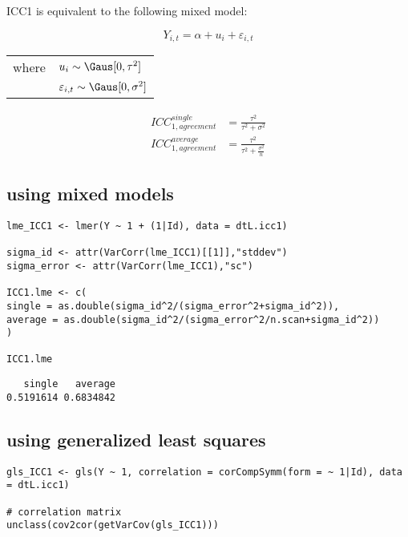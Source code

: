 \documentclass{article}
\begin{document}
\bigskip

ICC1 is equivalent to the following mixed model:

\begin{equation}
 Y_{i,t} = \alpha + u_{i} + \varepsilon_{i,t} 
\end{equation}

\begin{tabular}{ll}
where & \(u_{i} \sim \Gaus[0,\tau^2] \)  \\
& \(\varepsilon_{i,t} \sim \Gaus[0,\sigma^2] \) \\
\end{tabular}

\begin{align}
 ICC^{single}_{1,agreement} &= \frac{\tau^2}{\tau^2 + \sigma^2} \\
 ICC^{average}_{1,agreement} &= \frac{\tau^2}{\tau^2 + \frac{\sigma^2}{n}}
\end{align}

\bigskip

\subsection{using mixed models}
\label{sec:orgc8b4baa}
\lstset{language=r,label= ,caption= ,captionpos=b,numbers=none}
\begin{lstlisting}
lme_ICC1 <- lmer(Y ~ 1 + (1|Id), data = dtL.icc1)

sigma_id <- attr(VarCorr(lme_ICC1)[[1]],"stddev")
sigma_error <- attr(VarCorr(lme_ICC1),"sc")

ICC1.lme <- c(
single = as.double(sigma_id^2/(sigma_error^2+sigma_id^2)),
average = as.double(sigma_id^2/(sigma_error^2/n.scan+sigma_id^2))
)

ICC1.lme
\end{lstlisting}

\begin{verbatim}
   single   average 
0.5191614 0.6834842
\end{verbatim}

\bigskip

\subsection{using generalized least squares}
\label{sec:org2ec4104}
\lstset{language=r,label= ,caption= ,captionpos=b,numbers=none}
\begin{lstlisting}
gls_ICC1 <- gls(Y ~ 1, correlation = corCompSymm(form = ~ 1|Id), data = dtL.icc1)

# correlation matrix
unclass(cov2cor(getVarCov(gls_ICC1)))
\end{lstlisting}
\end{document}
